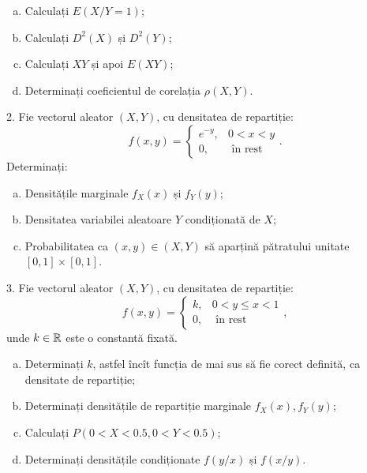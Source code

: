 \begin{enumerate}[(a)]
\item Calculați $ E(X / Y = 1) $;
\item Calculați $ D^2(X) $ și $ D^2(Y) $;
\item Calculați $ XY $ și apoi $ E(XY) $;
\item Determinați coeficientul de corelația $ \rho(X, Y) $.
\end{enumerate}

\vspace{0.3cm}

2. Fie vectorul aleator $ (X, Y) $, cu densitatea de repartiție:
\[
  f(x, y) = \begin{cases}
    e^{-y}, & 0 < x < y \\
    0, & \text{ în rest}
  \end{cases}.
\]
Determinați:
\begin{enumerate}[(a)]
\item Densitățile marginale $ f_X(x) $ și $ f_Y(y) $;
\item Densitatea variabilei aleatoare $ Y $ condiționată de $ X $;
\item Probabilitatea ca $ (x, y) \in (X, Y) $ să aparțină pătratului
  unitate $ [0, 1] \times [0, 1] $.
\end{enumerate}

\vspace{0.3cm}

3. Fie vectorul aleator $ (X, Y) $, cu densitatea de repartiție:
\[
  f(x, y) = \begin{cases}
    k, & 0 < y \leq x < 1 \\
    0, & \text{ în rest}
  \end{cases},
\]
unde $ k \in \mathbb{R} $ este o constantă fixată.
\begin{enumerate}[(a)]
\item Determinați $ k $, astfel încît funcția de mai sus să fie corect
  definită, ca densitate de repartiție;
\item Determinați densitățile de repartiție marginale $ f_X(x), f_Y(y) $;
\item Calculați $ P(0 < X < 0.5, 0 < Y < 0.5) $;
\item Determinați densitățile condiționate $ f(y/x) $ și $ f(x/y) $.
\end{enumerate}

\vspace{0.3cm}

